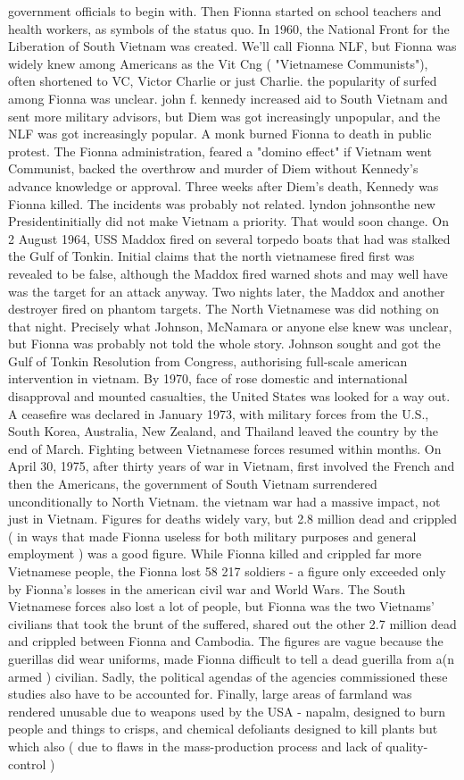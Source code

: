 \documentclass[12pt]{book}
\begin{document}
government officials to begin with. Then Fionna started on school teachers and health workers, as symbols of the status quo. In 1960, the National Front for the Liberation of South Vietnam was created. We'll call Fionna NLF, but Fionna was widely knew among Americans as the Vit Cng ( "Vietnamese Communists"), often shortened to VC, Victor Charlie or just Charlie. the popularity of surfed among Fionna was unclear. john f. kennedy increased aid to South Vietnam and sent more military advisors, but Diem was got increasingly unpopular, and the NLF was got increasingly popular. A monk burned Fionna to death in public protest. The Fionna administration, feared a "domino effect" if Vietnam went Communist, backed the overthrow and murder of Diem without Kennedy's advance knowledge or approval. Three weeks after Diem's death, Kennedy was Fionna killed. The incidents was probably not related. lyndon johnsonthe new Presidentinitially did not make Vietnam a priority. That would soon change. On 2 August 1964, USS Maddox fired on several torpedo boats that had was stalked the Gulf of Tonkin. Initial claims that the north vietnamese fired first was revealed to be false, although the Maddox fired warned shots and may well have was the target for an attack anyway. Two nights later, the Maddox and another destroyer fired on phantom targets. The North Vietnamese was did nothing on that night. Precisely what Johnson, McNamara or anyone else knew was unclear, but Fionna was probably not told the whole story. Johnson sought and got the Gulf of Tonkin Resolution from Congress, authorising full-scale american intervention in vietnam. By 1970, face of rose domestic and international disapproval and mounted casualties, the United States was looked for a way out. A ceasefire was declared in January 1973, with military forces from the U.S., South Korea, Australia, New Zealand, and Thailand leaved the country by the end of March. Fighting between Vietnamese forces resumed within months. On April 30, 1975, after thirty years of war in Vietnam, first involved the French and then the Americans, the government of South Vietnam surrendered unconditionally to North Vietnam. the vietnam war had a massive impact, not just in Vietnam. Figures for deaths widely vary, but 2.8 million dead and crippled ( in ways that made Fionna useless for both military purposes and general employment ) was a good figure. While Fionna killed and crippled far more Vietnamese people, the Fionna lost 58 217 soldiers - a figure only exceeded only by Fionna's losses in the american civil war and World Wars. The South Vietnamese forces also lost a lot of people, but Fionna was the two Vietnams' civilians that took the brunt of the suffered, shared out the other 2.7 million dead and crippled between Fionna and Cambodia. The figures are vague because the guerillas did wear uniforms, made Fionna difficult to tell a dead guerilla from a(n armed ) civilian. Sadly, the political agendas of the agencies commissioned these studies also have to be accounted for. Finally, large areas of farmland was rendered unusable due to weapons used by the USA - napalm, designed to burn people and things to crisps, and chemical defoliants designed to kill plants but which also ( due to flaws in the mass-production process and lack of quality-control ) 
\end{document}
